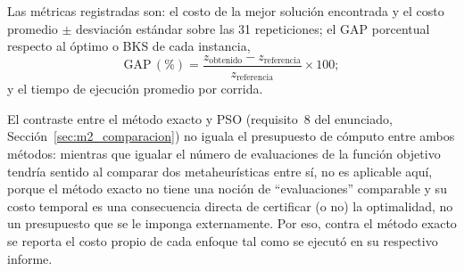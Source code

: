 Las métricas registradas son: el costo de la mejor solución encontrada y el costo
promedio $\pm$ desviación estándar sobre las 31 repeticiones; el GAP porcentual
respecto al óptimo o BKS de cada instancia,
\begin{equation}
    \text{GAP}\,(\%) = \frac{z_{\text{obtenido}} - z_{\text{referencia}}}{z_{\text{referencia}}} \times 100;
\end{equation}
y el tiempo de ejecución promedio por corrida.

El contraste entre el método exacto y PSO (requisito~8 del enunciado,
Sección~\ref{sec:m2_comparacion}) no iguala el presupuesto de cómputo entre ambos
métodos: mientras que igualar el número de evaluaciones de la función objetivo tendría
sentido al comparar dos metaheurísticas entre sí, no es aplicable aquí, porque el método
exacto no tiene una noción de ``evaluaciones'' comparable y su costo temporal es una
consecuencia directa de certificar (o no) la optimalidad, no un presupuesto que se le
imponga externamente. Por eso, contra el método exacto se reporta el costo propio de
cada enfoque tal como se ejecutó en su respectivo informe.
